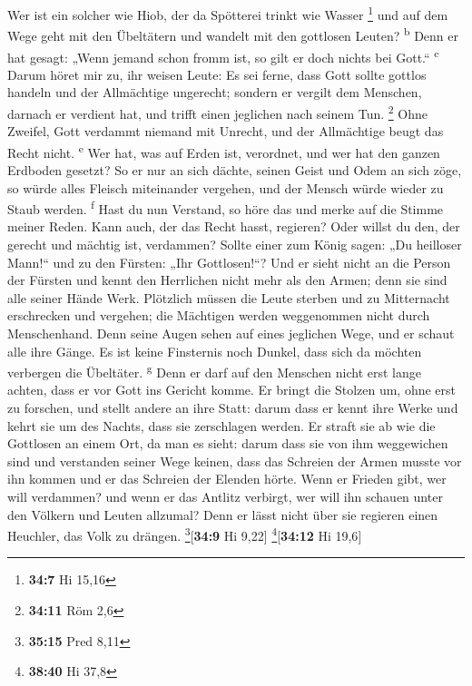  Wer ist ein solcher wie Hiob, der da Spötterei trinkt wie
Wasser \footnote{\textbf{34:7} Hi 15,16}  und auf dem Wege
geht mit den Übeltätern und wandelt mit den gottlosen Leuten?
\textsuperscript{b}  Denn er hat gesagt: „Wenn jemand
schon fromm ist, so gilt er doch nichts bei Gott.`` \textsuperscript{c}
 Darum höret mir zu, ihr weisen Leute: Es sei ferne, dass
Gott sollte gottlos handeln und der Allmächtige ungerecht;
 sondern er vergilt dem Menschen, darnach er verdient
hat, und trifft einen jeglichen nach seinem Tun. \footnote{\textbf{34:11}
  Röm 2,6}  Ohne Zweifel, Gott verdammt niemand mit
Unrecht, und der Allmächtige beugt das Recht nicht. \textsuperscript{e}
 Wer hat, was auf Erden ist, verordnet, und wer hat den
ganzen Erdboden gesetzt?  So er nur an sich dächte,
seinen Geist und Odem an sich zöge,  so würde alles
Fleisch miteinander vergehen, und der Mensch würde wieder zu Staub
werden. \textsuperscript{f}  Hast du nun Verstand, so
höre das und merke auf die Stimme meiner Reden.  Kann
auch, der das Recht hasst, regieren? Oder willst du den, der gerecht und
mächtig ist, verdammen?  Sollte einer zum König sagen:
„Du heilloser Mann!{}`` und zu den Fürsten: „Ihr Gottlosen!{}``?
 Und er sieht nicht an die Person der Fürsten und kennt
den Herrlichen nicht mehr als den Armen; denn sie sind alle seiner Hände
Werk.  Plötzlich müssen die Leute sterben und zu
Mitternacht erschrecken und vergehen; die Mächtigen werden weggenommen
nicht durch Menschenhand.  Denn seine Augen sehen auf
eines jeglichen Wege, und er schaut alle ihre Gänge.  Es
ist keine Finsternis noch Dunkel, dass sich da möchten verbergen die
Übeltäter. \textsuperscript{g}  Denn er darf auf den
Menschen nicht erst lange achten, dass er vor Gott ins Gericht komme.
 Er bringt die Stolzen um, ohne erst zu forschen, und
stellt andere an ihre Statt:  darum dass er kennt ihre
Werke und kehrt sie um des Nachts, dass sie zerschlagen werden.
 Er straft sie ab wie die Gottlosen an einem Ort, da man
es sieht:  darum dass sie von ihm weggewichen sind und
verstanden seiner Wege keinen,  dass das Schreien der
Armen musste vor ihn kommen und er das Schreien der Elenden hörte.
 Wenn er Frieden gibt, wer will verdammen? und wenn er
das Antlitz verbirgt, wer will ihn schauen unter den Völkern und Leuten
allzumal?  Denn er lässt nicht über sie regieren einen
Heuchler, das Volk zu drängen. \footnote{\textbf{35:15} Pred 8,11}{[}\textbf{34:9}
Hi 9,22{]} \footnote{\textbf{38:40} Hi 37,8}{[}\textbf{34:12} Hi 19,6{]}


